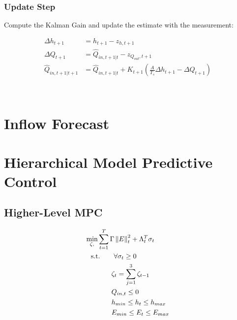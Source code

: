 	\subsubsection*{Update Step}
	Compute the Kalman Gain and update the estimate with the measurement:

	\begin{align*}
		\Delta h_{t+1} &= h_{t+1} - z_{h,t+1} \\
		\Delta Q_{t+1} &= \hat{Q}_{in,t+1|t} - z_{Q_{out},t+1} \\
		\hat{Q}_{in,t+1|t+1} &= \hat{Q}_{in,t+1|t} + K_{t+1} \left(\frac{A}{T_s}\Delta h_{t+1} - \Delta Q_{t+1} \right)
		\end{align*}
	
\


\section{Inflow Forecast}

\section{Hierarchical Model Predictive Control}
	\subsection{Higher-Level MPC}
		\begin{subequations}\label{P0:higher_mpc}
			\begin{align}
				\underset{\zeta, }{\text{min}}& \sum_{t=1}^{T} \Gamma \left\lVert E \right\rVert^{2}_{t} + \Lambda_t^T \sigma_t   \label{P0:1} \\
				&\hspace{-1em} \text{s.t.}  \quad \quad \forall \sigma_t \geq 0 \label{P0:2} \\
				& \qquad \zeta_{t} = \sum_{j=1}^3 \zeta_{t-1} \label{P0:3}  \\
				& \qquad Q_{in,t} \leq 0\label{P0:4} \\
				& \qquad h_{min}\leq h_{t} \leq h_{max}\label{P0:5}\\
				& \qquad E_{min}\leq E_{t} \leq E_{max}\label{P0:6}
		\end{align}
		\end{subequations}
	

